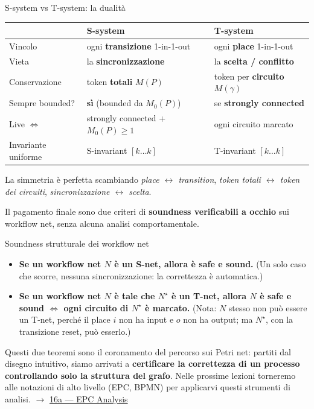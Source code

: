 \begin{boxabstract}{S-system vs T-system: la dualità}
\begingroup\small
\begin{tabularx}{\linewidth}{>{\raggedright\arraybackslash}X>{\raggedright\arraybackslash}X>{\raggedright\arraybackslash}X}
\toprule
\textbf{} & \textbf{\textbf{S-system}} & \textbf{\textbf{T-system}} \\
\midrule
Vincolo & ogni \textbf{transizione} 1-in-1-out & ogni \textbf{place} 1-in-1-out \\
Vieta & la \textbf{sincronizzazione} & la \textbf{scelta / conflitto} \\
Conservazione & token \textbf{totali} $M(P)$ & token per \textbf{circuito} $M(\gamma)$ \\
Sempre bounded? & \textbf{sì} (bounded da $M_0(P)$) & se \textbf{strongly connected} \\
Live $\iff$ & strongly connected + $M_0(P)\ge1$ & ogni circuito marcato \\
Invariante uniforme & S-invariant $[k\dots k]$ & T-invariant $[k\dots k]$ \\
\bottomrule
\end{tabularx}
\endgroup

La simmetria è perfetta scambiando \emph{place $\leftrightarrow$ transition}, \emph{token totali $\leftrightarrow$ token dei circuiti}, \emph{sincronizzazione $\leftrightarrow$ scelta}.
\end{boxabstract}

Il pagamento finale sono due criteri di \textbf{soundness verificabili a occhio} sui workflow net, senza alcuna analisi comportamentale.

\begin{boxtheorem}{Soundness strutturale dei workflow net}
\begin{itemize}
\item \textbf{Se un workflow net $N$ è un S-net, allora è safe e sound.} (Un solo caso che scorre, nessuna sincronizzazione: la correttezza è automatica.)
\item \textbf{Se un workflow net $N$ è tale che $N^\star$ è un T-net, allora $N$ è safe e sound $\iff$ ogni circuito di $N^\star$ è marcato.} (Nota: $N$ stesso non può essere un T-net, perché il place $i$ non ha input e $o$ non ha output; ma $N^\star$, con la transizione reset, può esserlo.)
\end{itemize}
\end{boxtheorem}

Questi due teoremi sono il coronamento del percorso sui Petri net: partiti dal disegno intuitivo, siamo arrivati a \textbf{certificare la correttezza di un processo controllando solo la struttura del grafo}. Nelle prossime lezioni torneremo alle notazioni di alto livello (EPC, BPMN) per applicarvi questi strumenti di analisi. $\rightarrow$ \hyperref[ch:16a]{16a — EPC Analysis}